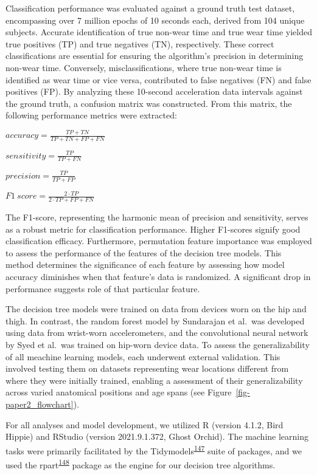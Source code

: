 \documentclass[
  10pt,
]{scrbook}
\begin{document}
Classification performance was evaluated against a ground truth test
dataset, encompassing over 7 million epochs of 10 seconds each, derived
from 104 unique subjects. Accurate identification of true non-wear time
and true wear time yielded true positives (TP) and true negatives (TN),
respectively. These correct classifications are essential for ensuring
the algorithm's precision in determining non-wear time. Conversely,
misclassifications, where true non-wear time is identified as wear time
or vice versa, contributed to false negatives (FN) and false positives
(FP). By analyzing these 10-second acceleration data intervals against
the ground truth, a confusion matrix was constructed. From this matrix,
the following performance metrics were extracted:

\hfill\break
\(accuracy=\frac{TP+TN}{TP+TN+FP+FN}\)

\hfill\break
\(sensitivity=\frac{TP}{TP+FN}​\)

\hfill\break
\(precision=\frac{TP}{TP+FP}\)

\hfill\break
\(​F1\ score=\frac{2 \cdot TP}{2 \cdot TP+FP+FN}​\)

The F1-score, representing the harmonic mean of precision and
sensitivity, serves as a robust metric for classification performance.
Higher F1-scores signify good classification efficacy. Furthermore,
permutation feature importance was employed to assess the performance of
the features of the decision tree models. This method determines the
significance of each feature by assessing how model accuracy diminishes
when that feature's data is randomized. A significant drop in
performance suggests role of that particular feature.

The decision tree models were trained on data from devices worn on the
hip and thigh. In contrast, the random forest model by Sundarajan et
al.~was developed using data from wrist-worn accelerometers, and the
convolutional neural network by Syed et al.~was trained on hip-worn
device data. To assess the generalizability of all meachine learning
models, each underwent external validation. This involved testing them
on datasets representing wear locations different from where they were
initially trained, enabling a assessment of their generalizability
across varied anatomical positions and age spans (see
Figure~\ref{fig-paper2_flowchart}).

For all analyses and model development, we utilized R (version 4.1.2,
Bird Hippie) and RStudio (version 2021.9.1.372, Ghost Orchid). The
machine learning tasks were primarily facilitated by the
Tidymodels\textsuperscript{\protect\hyperlink{ref-kuhn_tidymodels_2020}{147}}
suite of packages, and we used the
rpart\textsuperscript{\protect\hyperlink{ref-rpart}{148}} package as the
engine for our decision tree algorithms.
\end{document}
